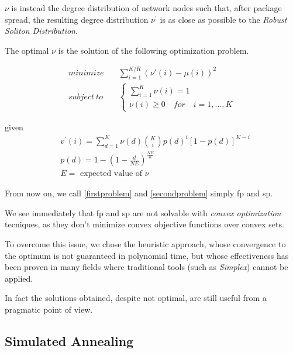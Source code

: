\documentclass[journal]{IEEEtran}
\begin{document}
$\nu$ is instead the degree distribution of network nodes such that, after package spread, the resulting degree distribution $\nu^\prime$ is as close as possible to the \emph{Robust Soliton Distribution}.

The optimal $\nu$ is the solution of the following optimization problem\cite{Lin2007}.

\begin{equation}
	\label{secondproblem}
	\begin{split}
		minimize & \quad \sum_{i=1}^{K/R}(\nu'(i)-\mu(i))^2 \\
		subject \ to & \quad \begin{cases}
			\sum_{i=1}^K \nu(i) = 1 \\
			\nu(i) \geq 0 \quad for \quad i=1,...,K
		\end{cases}
	\end{split}
\end{equation}

given
\begin{equation*}
	\begin{split}
		& v^\prime(i) = \sum_{d=1}^K \nu(d) \binom{K}{i} p(d)^i [1-p(d)]^{K-i} \\
		& p(d) = 1 - \left(1 -\frac{d}{N E}\right)^{\frac{N E}{K}} \\
		& E = \text{ expected value of }\nu
	\end{split}
\end{equation*}

From now on, we call \eqref{firstproblem} and \eqref{secondproblem} simply \gls{fp} and \gls{sp}.

We see immediately that \gls{fp} and \gls{sp} are not solvable with \emph{convex optimization} tecniques, as they don't minimize convex objective functions over convex sets.

To overcome this issue, we chose the heuristic approach, whose convergence to the optimum is not guaranteed in polynomial time, but whose effectiveness has been proven in many fields \cite{Edelkamp2010} where traditional tools (such as \emph{Simplex}) cannot be applied.

In fact the solutions obtained, despite not optimal, are still useful from a pragmatic point of view.


\subsection{Simulated Annealing}
\end{document}
